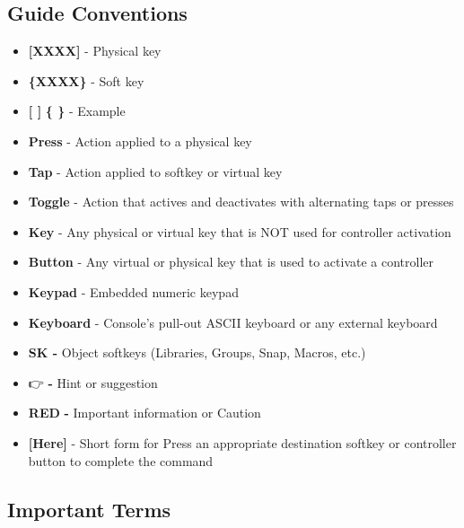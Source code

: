 \documentclass[
]{article}
\begin{document}
\hypertarget{guide-conventions}{%
\subsection{Guide Conventions}\label{guide-conventions}}

\begin{itemize}
\item
  \textbf{{[}XXXX{]}} - Physical key
\item
  \textbf{\{XXXX\}} - Soft key
\item
  \textbf{{[} {]}} \textbf{\{ \}} - Example
\item
  \textbf{Press} - Action applied to a physical key
\item
  \textbf{Tap} - Action applied to softkey or virtual key
\item
  \textbf{Toggle} - Action that actives and deactivates with alternating taps or presses
\item
  \textbf{Key} - Any physical or virtual key that is NOT used for controller activation
\item
  \textbf{Button} - Any virtual or physical key that is used to activate a controller
\item
  \textbf{Keypad} - Embedded numeric keypad
\item
  \textbf{Keyboard} - Console's pull-out ASCII keyboard or any external keyboard
\item
  \textbf{SK -} Object softkeys (Libraries, Groups, Snap, Macros, etc.)
\item
  👉 \textbf{-} Hint or suggestion
\item
  {\textbf{RED}} \textbf{-} Important information or Caution
\item
  \textbf{{[}Here{]}} - Short form for Press an appropriate destination softkey or controller button to complete the command
\end{itemize}

\hypertarget{important-terms}{%
\subsection{Important Terms}\label{important-terms}}
\end{document}
